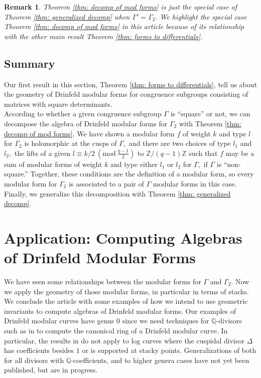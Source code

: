 \documentclass[11pt]{amsart}
\newtheorem{remark}[theorem]{Remark}
\theoremstyle{definition}
\numberwithin{equation}{section}
\newcommand{\bbQ}{\mathbb{Q}}		%
\newcommand{\bbZ}{\mathbb{Z}}		%
\newcommand{\Mod}[1]{\ (\mathrm{mod}\ #1)}
\begin{document}
\begin{remark}
	Theorem \ref{thm: decomp of mod forms} is just the special case of Theorem \ref{thm: generalized decomp} when $\Gamma'=\Gamma_2.$ We highlight the special case Theorem \ref{thm: decomp of mod forms} in this article because of its relationship with the other main result Theorem \ref{thm: forms to differentials}.
\end{remark}

\subsection{Summary}
Our first result in this section, Theorem \ref{thm: forms to differentials}, tell us about the geometry of Drinfeld modular forms for congruence subgroups consisting of matrices with square determinants.\\ 

According to whether a given congruence subgroup $\Gamma$ is ``square'' or not, we can decompose the algebra of Drinfeld modular forms for $\Gamma_2$ with Theorem \ref{thm: decomp of mod forms}.
We have shown a modular form $f$ of weight $k$ and type $l$ for $\Gamma_2$ is holomorphic at the cusps of $\Gamma,$ and there are two choices of type $l_1$ and $l_2,$ the lifts of a given $\displaystyle{l\equiv k/2\Mod{\frac{q-1}{2}}}$ to $\bbZ/(q-1)\bbZ$ such that $f$ may be a sum of modular forms of weight $k$ and type either $l_1$ or $l_2$ for $\Gamma,$ if $\Gamma$ is ``non-square.'' Together, these conditions are the definition of a modular form, so every modular form for $\Gamma_2$ is associated to a pair of $\Gamma$ modular forms in this case. Finally, we generalize this decomposition with Theorem \ref{thm: generalized decomp}.

\section{Application: Computing Algebras of Drinfeld Modular Forms}

We have seen some relationships between the modular forms for $\Gamma$ and $\Gamma_2.$ Now we apply the geometry of those modular forms, in particular in terms of stacks. We conclude the article with some examples of how we intend to use geometric invariants to compute algebras of Drinfeld modular forms. Our examples of Drinfeld modular curves have genus $0$ since we need techniques for $\bbQ$-divisors such as in \cite{ODorney-canonical-rings-Q-divisors-on-P1} to compute the canonical ring of a Drinfeld modular curve. In particular, the results in \cite{VZB} do not apply to log curves where the cuspidal divisor $\Delta$ has coefficients besides $1$ or is supported at stacky points. Generalizations of both \cite{VZB} for all divisors with $\bbQ$-coefficients, and \cite{ODorney-canonical-rings-Q-divisors-on-P1} to higher genera cases have not yet been published, but are in progress.\\
\end{document}
